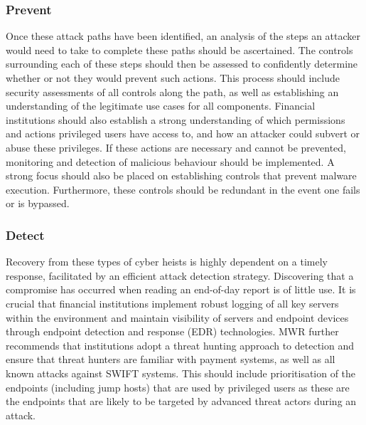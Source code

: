 \documentclass[12pt]{article}
\begin{document}
        \subsubsection{Prevent}
        Once these attack paths have been identified, an analysis of the steps an attacker would need to take to complete these paths should be ascertained. The controls surrounding each of these steps should then be assessed to confidently determine whether or not they would prevent such actions. This process should include security assessments of all controls along the path, as well as establishing an understanding of the legitimate use cases for all components. Financial institutions should also establish a strong understanding of which permissions and actions privileged users have access to, and how an attacker could subvert or abuse these privileges. If these actions are necessary and cannot be prevented, monitoring and detection of malicious behaviour should be implemented. A strong focus should also be placed on establishing controls that prevent malware execution. Furthermore, these controls should be redundant in the event one fails or is bypassed.
        
        \subsubsection{Detect}
        Recovery from these types of cyber heists is highly dependent on a timely response, facilitated by an efficient attack detection strategy. Discovering that a compromise has occurred when reading an end-of-day report is of little use. It is crucial that financial institutions implement robust logging of all key servers within the environment and maintain visibility of servers and endpoint devices through endpoint detection and response (EDR) technologies.
        MWR further recommends that institutions adopt a threat hunting approach to detection and ensure that threat hunters are familiar with payment systems, as well as all known attacks against SWIFT systems. This should include prioritisation of the endpoints (including jump hosts) that are used by privileged users as these are the endpoints that are likely to be targeted by advanced threat actors during an attack.
        
\end{document}

